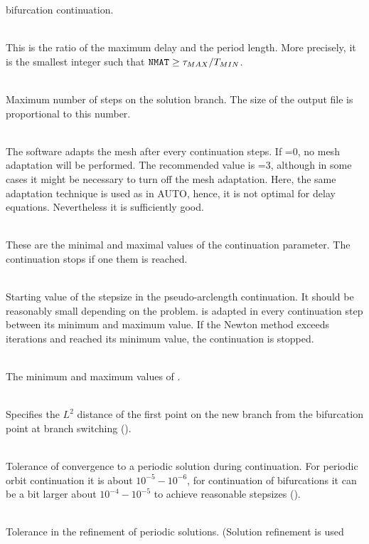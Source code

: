 \documentclass[10pt,a4paper]{ddedoc}
\begin{document}
\begin{description}
bifurcation continuation.
%
\item[\funp{NMAT}] ~\\
This is the ratio of the maximum delay and the period length. More precisely, it
is the smallest integer such that ${\tt NMAT} \ge \tau_{MAX}/T_{MIN}$.
%
\item[\funp{STEPS}] ~\\
Maximum number of steps on the solution branch. The size of the output file is proportional to this number.
%
\item[\funp{IAD}] ~\\
The software adapts the mesh after every  continuation steps.
If =0, no mesh adaptation will be performed. The recommended value is =3,
although in some cases it might be necessary to turn off the mesh adaptation.
Here, the same adaptation technique is used as in AUTO, hence, it is not optimal for delay equations. Nevertheless it is sufficiently good.
%
\item[\funp{CPMIN}, \funp{CPMAX}] ~\\
These are the minimal and maximal values of the continuation parameter. The continuation stops if one them is reached.
%
\item[\funp{DS}] ~\\
Starting value of the stepsize in the pseudo-arclength continuation.
It should be reasonably small depending on the problem.  is adapted in
every continuation step between its minimum and maximum value. If the Newton
method exceeds  iterations and  reached its minimum value,
the continuation is stopped.
%
\item[\funp{DSMIN}, \funp{DSMAX}] ~\\
The minimum and maximum values of .
%
\item[\funp{DSSTART}] ~\\
Specifies the $L^2$ distance of the first point on the new branch from the bifurcation 
point at branch switching ().
%
\item[\funp{EPSC}] ~\\
Tolerance of convergence to a periodic solution during continuation. For
periodic orbit continuation it is about $10^{-5} - 10^{-6}$, for continuation of
bifurcations it can be a bit larger about $10^{-4} - 10^{-5}$ to achieve
reasonable stepsizes ().
%
\item[\funp{EPSR}] ~\\
Tolerance in the refinement of periodic solutions. (Solution refinement is used

\end{description}
\end{document}
